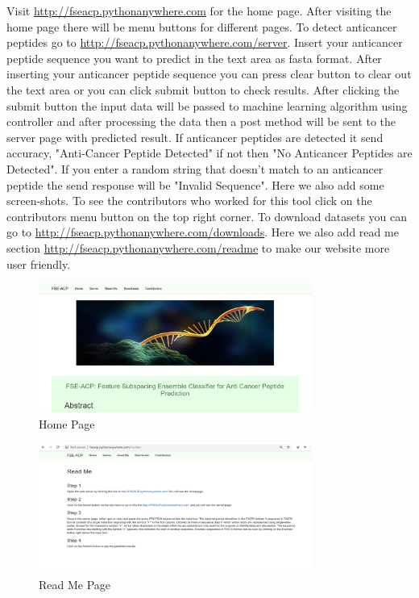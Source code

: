 Visit \url{http://fseacp.pythonanywhere.com} for the home page. After visiting the home page there will be menu buttons for different pages. To detect anticancer peptides go to \url{http://fseacp.pythonanywhere.com/server}. Insert your anticancer peptide sequence you want to predict in the text area as fasta format. After inserting your anticancer peptide sequence you can press clear button to clear out the text area or you can click submit button to check results. After clicking the submit button the input data will be passed to machine learning algorithm using controller and after processing the data then a post method will be sent to the server page with predicted result. If anticancer peptides are detected it send accuracy, "Anti-Cancer Peptide Detected" if not then "No Anticancer Peptides are Detected". If you enter a random string that doesn't match to an anticancer peptide the send response will be "Invalid Sequence". Here we also add some screen-shots. To see the contributors who worked for this tool click on the contributors menu button on the top right corner. To download datasets you can go to \url{http://fseacp.pythonanywhere.com/downloads}. Here we also add read me section \url{http://fseacp.pythonanywhere.com/readme} to make our website more user friendly.
\begin{figure}[H]
\centering
 \includegraphics[width=0.8\textwidth]{home.png}
 \caption{Home Page}
\end{figure}
\begin{figure}[H]
\centering
 \includegraphics[width=0.8\textwidth]{read.png}
 \caption{Read Me Page}
\end{figure}
